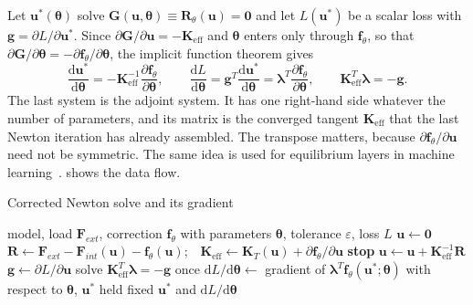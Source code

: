 Let $\bm u^\ast(\bm\theta)$ solve $\bm G(\bm u,\bm\theta)\equiv\bm R_\theta(\bm u)=\bm 0$ and let $L(\bm u^\ast)$ be a scalar loss with $\bm g=\partial L/\partial\bm u^\ast$. Since $\partial\bm G/\partial\bm u=-\bm K_{\mathrm{eff}}$ and $\bm\theta$ enters only through $\bm f_\theta$, so that $\partial\bm G/\partial\bm\theta=-\partial\bm f_\theta/\partial\bm\theta$, the implicit function theorem gives
\begin{equation}\label{eq:df-impl}
\frac{\mathrm d\bm u^\ast}{\mathrm d\bm\theta}=-\bm K_{\mathrm{eff}}^{-1}\frac{\partial\bm f_\theta}{\partial\bm\theta},\qquad
\frac{\mathrm dL}{\mathrm d\bm\theta}=\bm g^T\frac{\mathrm d\bm u^\ast}{\mathrm d\bm\theta}=\bm\lambda^T\frac{\partial\bm f_\theta}{\partial\bm\theta},\qquad \bm K_{\mathrm{eff}}^T\bm\lambda=-\bm g .
\end{equation}
The last system is the adjoint system. It has one right-hand side whatever the number of parameters, and its matrix is the converged tangent $\bm K_{\mathrm{eff}}$ that the last Newton iteration has already assembled. The transpose matters, because $\partial\bm f_\theta/\partial\bm u$ need not be symmetric. The same idea is used for equilibrium layers in machine learning~\cite{bai2019deq}.  shows the data flow.


\begin{algbox}{Corrected Newton solve and its gradient}
\begin{pseudo}
\Require model, load $\bm F_{ext}$, correction $\bm f_\theta$ with parameters $\bm\theta$, tolerance $\varepsilon$, loss $L$
\State $\bm u\gets\bm 0$
\Repeat {}
  \State $\bm R\gets\bm F_{ext}-\bm F_{int}(\bm u)-\bm f_\theta(\bm u)$;\ \ $\bm K_{\mathrm{eff}}\gets\bm K_T(\bm u)+\partial\bm f_\theta/\partial\bm u$
   \textbf{stop} \EndIf
  \State $\bm u\gets\bm u+\bm K_{\mathrm{eff}}^{-1}\bm R$
\State $\bm g\gets\partial L/\partial\bm u$ 
\State solve $\bm K_{\mathrm{eff}}^T\bm\lambda=-\bm g$ once
\State $\mathrm dL/\mathrm d\bm\theta\gets$ gradient of $\bm\lambda^T\bm f_\theta(\bm u^\ast;\bm\theta)$ with respect to $\bm\theta$, $\bm u^\ast$ held fixed
\Ensure $\bm u^\ast$ and $\mathrm dL/\mathrm d\bm\theta$
\end{pseudo}
\end{algbox}

